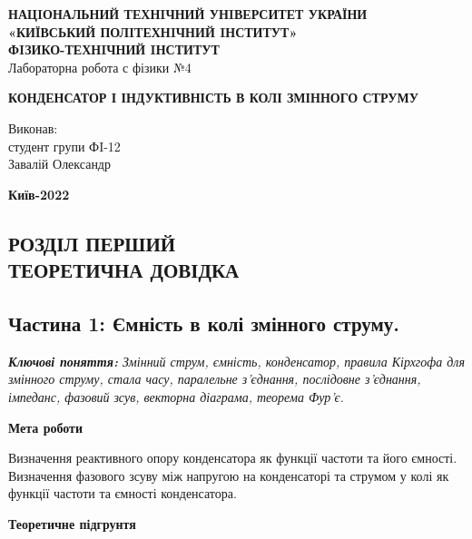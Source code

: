 \documentclass[a4paper,12pt]{article}
\begin{document}
    \begin{center}
		\hfill \break
		\large{\textbf{НАЦIОНАЛЬНИЙ ТЕХНIЧНИЙ УНIВЕРСИТЕТ УКРАЇНИ\\
				«КИЇВСЬКИЙ ПОЛIТЕХНIЧНИЙ IНСТИТУТ»\\
				ФIЗИКО-ТЕХНIЧНИЙ IНСТИТУТ}}\\
		\hfill \break \hfill \break \hfill\break \hfill \break \hfill \break \hfill \break \hfill \break
		\hfill \break \hfill \break
		\large{Лабораторна робота с фізики №4}
		\begin{center}
			\normalsize{\textbf{КОНДЕНСАТОР І ІНДУКТИВНІСТЬ В КОЛІ ЗМІННОГО СТРУМУ}}
		\end{center}
	\end{center}
	\hfill \break \hfill \break \hfill \break \hfill \break \hfill \break \hfill \break \hfill \break
	\hfill \break \hfill \break \hfill \break \hfill \break \hfill \break \hfill \break 
	\begin{flushright}
		\large{ \hspace{35pt} Виконав:\\
			студент групи ФI-12\\
			Завалій Олександр} 
	\end{flushright}
	\hfill \break \hfill \break \hfill \break \hfill \break \hfill \break \hfill \break \hfill \break
	\hfill \break \hfill \break 
	\begin{center} \textbf{Київ-2022} \end{center}
	\thispagestyle{empty}
	
\newpage
	\begin{center}
		\section* {РОЗДІЛ ПЕРШИЙ\\ТЕОРЕТИЧНА ДОВІДКА }
	\end{center}
    \subsection*{Частина 1: Ємність в колі змінного струму.}
	\textit{\textbf{Ключові поняття:} Змінний струм, ємність, конденсатор, правила Кірхгофа для змінного струму, 
    стала часу, паралельне з’єднання, послідовне з'єднання, імпеданс, фазовий зсув, векторна діаграма, теорема Фур’є.}
	\begin{center}
		\textbf{Мета роботи}
	\end{center}

    Визначення реактивного опору конденсатора як функції частоти та його ємності. 
    Визначення фазового зсуву між напругою на конденсаторі та струмом у колі як функції частоти та ємності конденсатора.
    \begin{center}
		\textbf{Теоретичне підгрунтя }
	\end{center}
\end{document}
